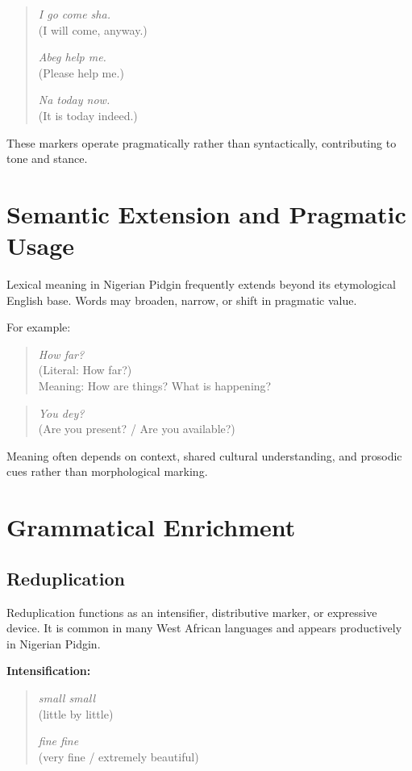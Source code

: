 \documentclass[12pt]{article}
\begin{document}
\begin{quote}
\textit{I go come sha.} \\
(I will come, anyway.)

\textit{Abeg help me.} \\
(Please help me.)

\textit{Na today now.} \\
(It is today indeed.)
\end{quote}

These markers operate pragmatically rather than syntactically, contributing to tone and stance.

\section{Semantic Extension and Pragmatic Usage}

Lexical meaning in Nigerian Pidgin frequently extends beyond its etymological English base. Words may broaden, narrow, or shift in pragmatic value.

For example:

\begin{quote}
\textit{How far?} \\
(Literal: How far?) \\
Meaning: How are things? What is happening?
\end{quote}

\begin{quote}
\textit{You dey?} \\
(Are you present? / Are you available?)
\end{quote}

Meaning often depends on context, shared cultural understanding, and prosodic cues rather than morphological marking.

\section{Grammatical Enrichment}

\subsection{Reduplication}

Reduplication functions as an intensifier, distributive marker, or expressive device. It is common in many West African languages and appears productively in Nigerian Pidgin.

\textbf{Intensification:}

\begin{quote}
\textit{small small} \\
(little by little)

\textit{fine fine} \\
(very fine / extremely beautiful)
\end{quote}
\end{document}
